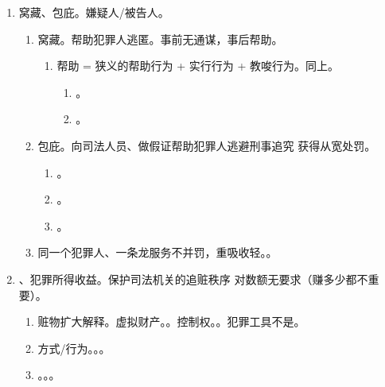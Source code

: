 \begin{enumerate}
\begin{enumerate}
\begin{enumerate}
                  \item {}。
                \end{enumerate}
        \end{enumerate}
  \item 窝藏、包庇。嫌疑人/被告人。
        \begin{enumerate}
          \item 窝藏。帮助犯罪人逃匿。事前无通谋，事后帮助。
                \begin{enumerate}
                  \item 帮助 = 狭义的帮助行为 + 实行行为 + 教唆行为。同上。
                        \begin{enumerate}
                          \item {}。
                          \item {}。
                        \end{enumerate}
                \end{enumerate}
          \item 包庇。向司法人员、做假证帮助犯罪人逃避刑事追究 \hz 获得从宽处罚。
                \begin{enumerate}
                  \item {}。
                  \item {}。
                  \item {}。
                \end{enumerate}
          \item 同一个犯罪人、一条龙服务不并罚，重吸收轻。。
        \end{enumerate}
  \item {}、犯罪所得收益。保护司法机关的追赃秩序 \yjt 对数额无要求（赚多少都不重要）。
        \begin{enumerate}
          \item 赃物扩大解释。\yi 虚拟财产。。\er 控制权。。\san 犯罪工具不是。
          \item 方式/行为。。。
          \item {}。。。

\end{enumerate}
\end{enumerate}
